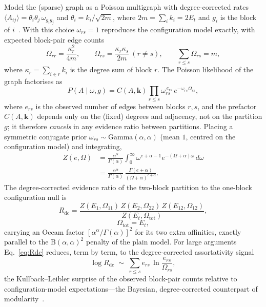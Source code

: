 \documentclass[aps,pre,twocolumn,superscriptaddress,floatfix,nofootinbib]{revtex4-2}
\newcommand{\Bt}{\mathrm{B}}
\newcommand{\Om}{\Omega}
\begin{document}
Model the (sparse) graph as a Poisson multigraph with degree-corrected rates
$\langle A_{ij}\rangle=\theta_i\theta_j\,\omega_{g_i g_j}$ and
$\theta_i=k_i/\sqrt{2m}$, where $2m=\sum_i k_i=2E_t$ and $g_i$ is the block of
$i$~\cite{karrer2011stochastic}. With this choice $\omega_{rs}=1$ reproduces the
configuration model exactly, with expected block-pair edge counts
\begin{equation}
\Om_{rr}=\frac{\kappa_r^2}{4m},\qquad
\Om_{rs}=\frac{\kappa_r\kappa_s}{2m}\ (r\neq s),\qquad
\sum_{r\le s}\Om_{rs}=m,
\label{eq:omega}
\end{equation}
where $\kappa_r=\sum_{i\in r}k_i$ is the degree sum of block $r$. The Poisson
likelihood of the graph factorises as
\begin{equation}
P(A\mid\omega,g)=C(A,\bm{k})\prod_{r\le s}
\omega_{rs}^{\,e_{rs}}\,e^{-\omega_{rs}\Om_{rs}},
\label{eq:dclik}
\end{equation}
where $e_{rs}$ is the observed number of edges between blocks $r,s$, and the
prefactor $C(A,\bm{k})$ depends only on the (fixed) degrees and adjacency, not
on the partition $g$; it therefore \emph{cancels} in any evidence ratio between
partitions. Placing a symmetric conjugate prior
$\omega_{rs}\sim\mathrm{Gamma}(\alpha,\alpha)$ (mean $1$, centred on the
configuration model) and integrating,
\begin{align}
Z(e,\Om)&=\frac{\alpha^\alpha}{\Gamma(\alpha)}\int_0^\infty
\omega^{e+\alpha-1}e^{-(\Om+\alpha)\omega}\,d\omega
\nonumber\\
&=\frac{\alpha^\alpha}{\Gamma(\alpha)}\,
\frac{\Gamma(e{+}\alpha)}{(\Om{+}\alpha)^{e+\alpha}} .
\label{eq:Zdc}
\end{align}
The degree-corrected evidence ratio of the two-block partition to the
one-block configuration null is
\begin{equation}
R_{\mathrm{dc}}=\frac{Z(E_1,\Om_{11})\,Z(E_2,\Om_{22})\,Z(E_{12},\Om_{12})}
{Z(E_t,\Om_{\mathrm{tot}})},
\label{eq:Rdc}
\end{equation}
\begin{equation}
\Om_{\mathrm{tot}}=E_t,
\end{equation}
carrying an Occam factor $[\alpha^\alpha/\Gamma(\alpha)]^2$ for its two extra
affinities, exactly parallel to the $\Bt(\alpha,\alpha)^2$ penalty of the plain
model. For large arguments Eq.~\eqref{eq:Rdc} reduces, term by term, to the
degree-corrected assortativity signal
\begin{equation}
\log R_{\mathrm{dc}}\;\sim\;\sum_{r\le s} e_{rs}\,
\ln\!\frac{e_{rs}}{\Om_{rs}},
\label{eq:KL}
\end{equation}
the Kullback--Leibler surprise of the observed block-pair counts relative to
configuration-model expectations---the Bayesian, degree-corrected counterpart
of modularity~\cite{newman2006modularity}.
\end{document}
